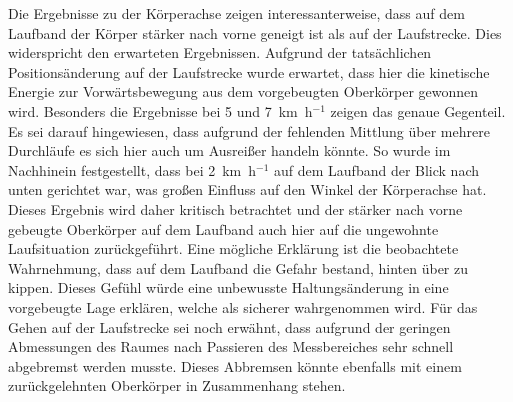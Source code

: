 Die Ergebnisse zu der Körperachse zeigen interessanterweise, dass auf dem Laufband der Körper stärker nach vorne geneigt ist als auf der Laufstrecke. Dies widerspricht den erwarteten Ergebnissen. Aufgrund der tatsächlichen Positionsänderung auf der Laufstrecke wurde erwartet, dass hier die kinetische Energie zur Vorwärtsbewegung aus dem vorgebeugten Oberkörper gewonnen wird. Besonders die Ergebnisse bei 5 und 7~km~h$^{-1}$ zeigen das genaue Gegenteil. Es sei darauf hingewiesen, dass aufgrund der fehlenden Mittlung über mehrere Durchläufe es sich hier auch um Ausreißer handeln könnte. So wurde im Nachhinein festgestellt, dass bei 2~km~h$^{-1}$ auf dem Laufband der Blick nach unten gerichtet war, was großen Einfluss auf den Winkel der Körperachse hat. Dieses Ergebnis wird daher kritisch betrachtet und der stärker nach vorne gebeugte Oberkörper auf dem Laufband auch hier auf die ungewohnte Laufsituation zurückgeführt. Eine mögliche Erklärung ist die beobachtete Wahrnehmung, dass auf dem Laufband die Gefahr bestand, hinten über zu kippen. Dieses Gefühl würde eine unbewusste Haltungsänderung in eine vorgebeugte Lage erklären, welche als sicherer wahrgenommen wird. Für das Gehen auf der Laufstrecke sei noch erwähnt, dass aufgrund der geringen Abmessungen des Raumes nach Passieren des Messbereiches sehr schnell abgebremst werden musste. Dieses Abbremsen könnte ebenfalls mit einem zurückgelehnten Oberkörper in Zusammenhang stehen.

